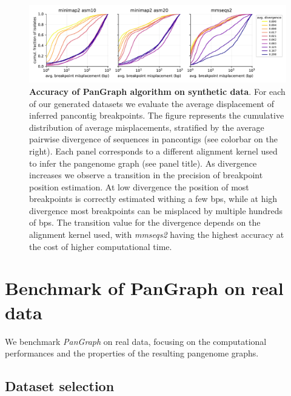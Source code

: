 \documentclass[aps,rmp,reprint,superscriptaddress,notitlepage,10pt,onecolumn]{revtex4-1}
\begin{document}
\begin{figure}[htb]
    \includegraphics[width=\textwidth]{figs_suppl/accuracy_comparison.pdf}
    \caption{{\bf Accuracy of PanGraph algorithm on synthetic data}. For each of our generated datasets we evaluate the average displacement of inferred pancontig breakpoints. The figure represents the cumulative distribution of average misplacements, stratified by the average pairwise divergence of sequences in pancontigs (see colorbar on the right). Each panel corresponds to a different alignment kernel used to infer the pangenome graph (see panel title). As divergence increases we observe a transition in the precision of breakpoint position estimation. At low divergence the position of most breakpoints is correctly estimated withing a few bps, while at high divergence most breakpoints can be misplaced by multiple hundreds of bps. The transition value for the divergence depends on the alignment kernel used, with \textit{mmseqs2} having the highest accuracy at the cost of higher computational time.}
    \label{fig:benchmark-accuracy-suppl}
\end{figure}

\section{Benchmark of PanGraph on real data}

We benchmark \textit{PanGraph} on real data, focusing on the computational performances and the properties of the resulting pangenome graphs.

\subsection{Dataset selection}
\end{document}
